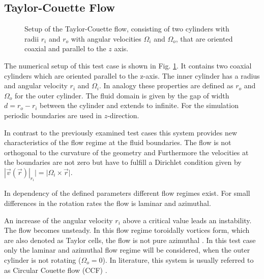 \subsection{Taylor-Couette Flow}

\begin{figure}[!bp]
  \begin{minipage}[c]{0.6\textwidth}
      \centering
  \end{minipage}
  \begin{minipage}[c]{0.3\textwidth}
      \caption{Setup of the Taylor-Couette flow, consisting of  two cylinders with radii $r_i$ and $r_o$ with angular velocities $\Omega_i$ and $\Omega_o$, that are oriented coaxial
       and parallel to the $z$ axis.
      \label{validation:setup_tcflow}
      }
  \end{minipage}
\end{figure}

The numerical setup of this test case is shown in Fig. \ref{validation:setup_tcflow}.
It contains two coaxial cylinders which are oriented parallel to the z-axis.
The inner cylinder has a radius and angular velocity $r_i$ and $\Omega_i$. In analogy these properties are defined as
$r_o$ and $\Omega_o$ for the outer cylinder.
The fluid domain is given by the gap of width $d = r_o - r_i$ between the cylinder and extends to infinite.
For the simulation  periodic boundaries are used in $z$-direction.

In contrast to the previously examined test cases this system provides new characteristics
of the flow regime at the fluid boundaries. The flow is not orthogonal to the curvature of the geometry and
Furthermore the velocities at the boundaries are not zero but have to fulfill  a Dirichlet condition given by
$|\vec{v}(\vec{r})|_{r_i} | = |\Omega_i \times \vec{r}|$.

In dependency of the defined parameters different flow regimes exist.
For small differences in the rotation rates the flow is laminar and azimuthal.

An increase of the angular velocity $r_i$ above a critical value leads an instability. The flow becomes unsteady.
In this flow regime toroidally vortices form, which are also denoted as Taylor cells,
the flow is not pure azimuthal \citep{tritton88}.
In this test case only the laminar and azimuthal flow regime will be considered, when the outer cylinder is not rotating ($\Omega_o = 0$).
In literature, this system is usually referred to as Circular Couette flow (CCF) \citep{Kundu2012}.

